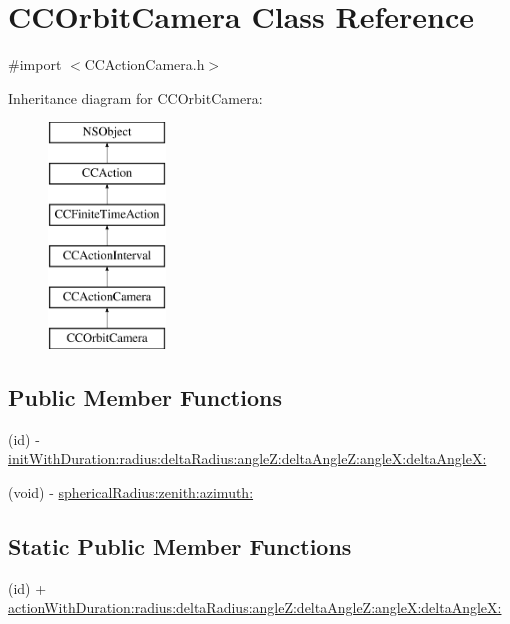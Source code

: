 \hypertarget{interface_c_c_orbit_camera}{\section{C\-C\-Orbit\-Camera Class Reference}
\label{interface_c_c_orbit_camera}
}


{\ttfamily \#import $<$C\-C\-Action\-Camera.\-h$>$}

Inheritance diagram for C\-C\-Orbit\-Camera\-:\begin{figure}[H]
\begin{center}
\leavevmode
\includegraphics[height=6.000000cm]{interface_c_c_orbit_camera}
\end{center}
\end{figure}
\subsection*{Public Member Functions}
\begin{DoxyCompactItemize}
\item 
(id) -\/ \hyperlink{interface_c_c_orbit_camera_a88a52c92e7dac0264ac7032bf6cf6536}{init\-With\-Duration\-:radius\-:delta\-Radius\-:angle\-Z\-:delta\-Angle\-Z\-:angle\-X\-:delta\-Angle\-X\-:}
\item 
(void) -\/ \hyperlink{interface_c_c_orbit_camera_a25efcdb240e724c8338126dcccbc05f2}{spherical\-Radius\-:zenith\-:azimuth\-:}
\end{DoxyCompactItemize}
\subsection*{Static Public Member Functions}
\begin{DoxyCompactItemize}
\item 
(id) + \hyperlink{interface_c_c_orbit_camera_a9b358cef606a0288c7dcf214003a40c9}{action\-With\-Duration\-:radius\-:delta\-Radius\-:angle\-Z\-:delta\-Angle\-Z\-:angle\-X\-:delta\-Angle\-X\-:}
\end{DoxyCompactItemize}
